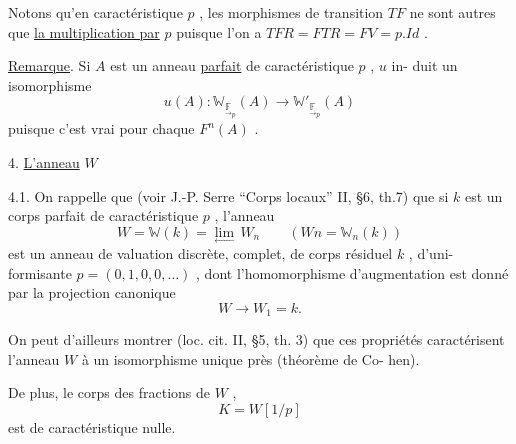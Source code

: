 Notons qu'en caractéristique $p$ , les morphismes de transition $TF$ ne
sont autres que \uline{la multiplication par} $p$ puisque l'on a $TFR = FTR = FV = p.Id$ .

\uline{Remarque}. Si $A$ est un anneau \uline{parfait} de caractéristique $p$ , $u$ in-%
duit un isomorphisme
\[ u(A) : \mathbb{W}_{\underset{\to}{\mathbb{F}}_{p}}(A) \to \mathbb{W}'_{\underset{\to}{\mathbb{F}}_{p}}(A) \]
puisque c'est vrai pour chaque $F^{n}(A)$ .

4. \uline{L'anneau} $W$

4.1. On rappelle que (voir J.-P. Serre ``Corps locaux'' II, §6, th.7)
que si $k$ est un corps parfait de caractéristique $p$ , l'anneau
\[ W = \mathbb{W}(k) = \underset{\leftarrow}{\lim}\, W_{n} \qquad (Wn = \mathbb{W}_{n}(k)) \]
est un anneau de valuation discrète, complet, de corps résiduel $k$ , d'uni-%
formisante $p = (0,1,0,0,\ldots)$ , dont l'homomorphisme d'augmentation est
donné par la projection canonique
\[ W \to W_{1} = k . \]

On peut d'ailleurs montrer (loc. cit. II, §5, th. 3) que ces propriétés
caractérisent l'anneau $W$ à un isomorphisme unique près (théorème de Co-%
hen).

De plus, le corps des fractions de $W$ ,
\[ K = W[1/p] \]
est de caractéristique nulle.

